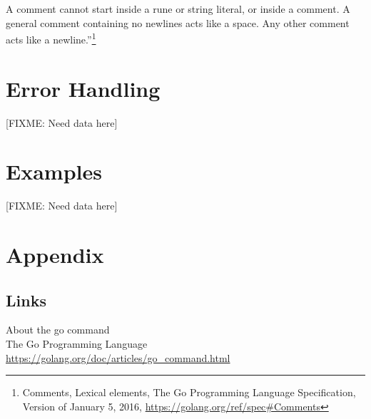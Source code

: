 \documentclass[12pt,letterpaper,dvips]{article}
\newcommand{\FIXME}[1]{\textsf{[FIXME: #1]}}
\begin{document}
\noindent A comment cannot start inside a rune or string literal, or
inside a comment. A general comment containing no newlines
acts like a space. Any other comment acts like a newline.''\footnote{Comments,
Lexical elements, The Go Programming Language Specification,
Version of January 5, 2016,
\href{https://golang.org/ref/spec\#Comments}{https://golang.org/ref/spec\#Comments}}


\newpage
\section{Error Handling}
\FIXME{Need data here}


\section{Examples}
\FIXME{Need data here}


\newpage
\setcounter{secnumdepth}{0}
\section{Appendix}


\subsection{Links}

About the go command\\
The Go Programming Language\\
\href{https://golang.org/doc/articles/go\_command.html}{https://golang.org/doc/articles/go\_command.html}
\\
\end{document}
